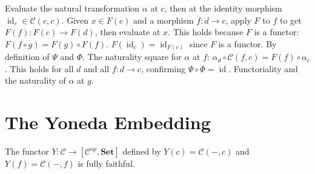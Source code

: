 \begin{prooflog}
           {Evaluate the natural transformation $\alpha$ at $c$, then at the
            identity morphism $\operatorname{id}_c \in \mathcal{C}(c,c)$.}
           {Given $x \in F(c)$ and a morphism $f : d \to c$, apply $F$ to $f$
            to get $F(f) : F(c) \to F(d)$, then evaluate at $x$.}
           {This holds because $F$ is a functor: $F(f \circ g) = F(g) \circ F(f)$.}
           {$F(\operatorname{id}_c) = \operatorname{id}_{F(c)}$ since $F$ is a functor.}
           {By definition of $\Psi$ and $\Phi$.}
           {The naturality square for $\alpha$ at $f$: $\alpha_d \circ \mathcal{C}(f,c) = F(f) \circ \alpha_c$.}
           {This holds for all $d$ and all $f : d \to c$, confirming $\Psi \circ \Phi = \operatorname{id}$.}
           {Functoriality and the naturality of $\alpha$ at $g$.}
\end{prooflog}

\section{The Yoneda Embedding}

\begin{theorem}
The functor $Y : \mathcal{C} \to [\mathcal{C}^{op}, \mathbf{Set}]$ defined by
$Y(c) = \mathcal{C}(-, c)$ and $Y(f) = \mathcal{C}(-, f)$ is fully faithful.
\end{theorem}

